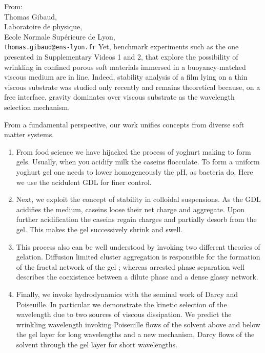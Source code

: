 \documentclass[a4paper, parskip=true, firsthead=false, fromemail=true, foldmarks=false]{scrlttr2}
\begin{document}
\begin{letter}{From:\\
Thomas Gibaud,\\
Laboratoire de physique,\\
Ecole Normale Supérieure de Lyon,\\
\texttt{thomas.gibaud@ens-lyon.fr}
}
Yet, benchmark experiments such as the one presented in Supplementary Videos 1 and 2, that explore the possibility of wrinkling in confined porous soft materials immersed in a buoyancy-matched viscous medium are in line. Indeed, stability analysis of a film lying on a thin viscous substrate was studied only recently and remains theoretical because, on a free interface, gravity dominates over viscous substrate as the wavelength selection mechanism.

From a fundamental perspective, our work unifies concepts from diverse soft matter systems.
\begin{enumerate}
\item From food science we have hijacked the process of yoghurt making to form gels. Usually, when you acidify milk the caseins flocculate. To form a uniform yoghurt gel one needs to lower homogeneously the pH, as bacteria do. Here we use the acidulent GDL for finer control.

\item  Next, we exploit the concept of stability in colloidal suspensions. As the GDL acidifies the medium, caseins loose their net charge and aggregate. Upon further acidification the caseins regain charges and partially desorb from the gel. This makes the gel successively shrink and swell.

\item This process also can be well understood by invoking two different theories of gelation. Diffusion limited cluster aggregation is responsible for the formation of the fractal network of the gel ; whereas arrested phase separation well describes the coexistence between a dilute phase and a dense glassy network.

\item Finally, we invoke hydrodynamics with the seminal work of Darcy and Poiseuille. In particular we demonstrate the kinetic selection of the wavelength due to two sources of viscous dissipation. We predict the wrinkling wavelength invoking Poiseuille flows of the solvent above and below the gel layer for long wavelengths and a new mechanism, Darcy flows of the solvent through the gel layer for short wavelengths.
\end{enumerate}




\end{letter}
\end{document}

